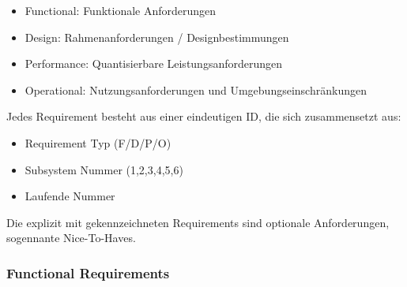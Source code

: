 \begin{itemize}
    \item Functional: Funktionale Anforderungen
    \item Design: Rahmenanforderungen / Designbestimmungen
    \item Performance: Quantisierbare Leistungsanforderungen
    \item Operational: Nutzungsanforderungen und Umgebungseinschränkungen
\end{itemize}

Jedes Requirement besteht aus einer eindeutigen ID, die sich zusammensetzt aus:

\begin{itemize}
    \item Requirement Typ (F/D/P/O)
    \item Subsystem Nummer (1,2,3,4,5,6)
    \item Laufende Nummer
\end{itemize}




Die explizit mit \OPT{*} gekennzeichneten Requirements sind optionale Anforderungen, sogennante Nice-To-Haves.

\subsubsection{Functional Requirements}

